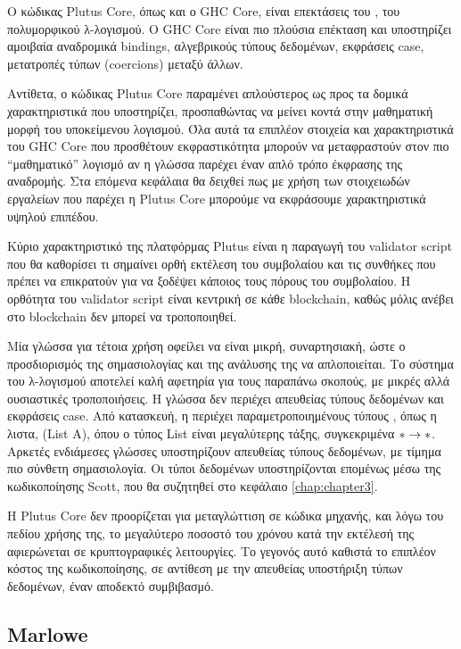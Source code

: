 Ο κώδικας Plutus Core, όπως και ο GHC Core, είναι επεκτάσεις του \FOM{}, του
πολυμορφικού λ-λογισμού.  Ο GHC Core είναι πιο πλούσια επέκταση και υποστηρίζει
αμοιβαία αναδρομικά bindings, αλγεβρικούς τύπους δεδομένων, εκφράσεις case,
μετατροπές τύπων (coercions) μεταξύ άλλων.

Αντίθετα, ο κώδικας Plutus Core παραμένει απλούστερος ως προς τα δομικά
χαρακτηριστικά που υποστηρίζει, προσπαθώντας να μείνει κοντά στην μαθηματική
μορφή του υποκείμενου λογισμού.  Όλα αυτά τα επιπλέον στοιχεία και
χαρακτηριστικά του GHC Core που προσθέτουν εκφραστικότητα μπορούν να
μεταφραστούν στον πιο ``μαθηματικό'' λογισμό αν η γλώσσα παρέχει έναν απλό τρόπο
έκφρασης της αναδρομής. Στα επόμενα κεφάλαια θα δειχθεί πως με χρήση των
στοιχειωδών εργαλείων που παρέχει η Plutus Core μπορούμε να εκφράσουμε
χαρακτηριστικά υψηλού επιπέδου.

Κύριο χαρακτηριστικό της πλατφόρμας Plutus είναι η παραγωγή του validator
script που θα καθορίσει τι σημαίνει ορθή εκτέλεση του συμβολαίου και τις
συνθήκες που πρέπει να επικρατούν για να ξοδέψει κάποιος τους πόρους του
συμβολαίου. Η ορθότητα του validator script είναι κεντρική σε κάθε blockchain,
καθώς μόλις ανέβει στο blockchain δεν μπορεί να τροποποιηθεί.

Μία γλώσσα για τέτοια χρήση οφείλει να είναι μικρή, συναρτησιακή, ώστε ο
προσδιορισμός της σημασιολογίας και της ανάλυσης της να απλοποιείται. Το
σύστημα του λ-λογισμού \FOM{} αποτελεί καλή αφετηρία για τους παραπάνω σκοπούς,
με μικρές αλλά ουσιαστικές τροποποιήσεις. Η γλώσσα δεν περιέχει απευθείας
τύπους δεδομένων και εκφράσεις case. Από κατασκευή, η \FOM{} περιέχει
παραμετροποιημένους τύπους , όπως η λιστα, (List A), όπου ο τύπος List είναι
μεγαλύτερης τάξης, συγκεκριμένα $\operatorname{\ast} \rightarrow \operatorname{\ast}$. Αρκετές ενδιάμεσες
γλώσσες υποστηρίζουν απευθείας τύπους δεδομένων, με τίμημα πιο σύνθετη
σημασιολογία. Οι τύποι δεδομένων υποστηρίζονται επομένως μέσω της κωδικοποίησης
Scott, που θα συζητηθεί στο κεφάλαιο \ref{chap:chapter3}.

Η Plutus Core δεν προορίζεται για μεταγλώττιση σε κώδικα μηχανής, και λόγω του
πεδίου χρήσης της, το μεγαλύτερο ποσοστό του χρόνου κατά την εκτέλεσή της
αφιερώνεται σε κρυπτογραφικές λειτουργίες. Το γεγονός αυτό καθιστά το επιπλέον
κόστος της κωδικοποίησης, σε αντίθεση με την απευθείας υποστήριξη τύπων
δεδομένων, έναν αποδεκτό συμβιβασμό.

\subsection{Marlowe}

